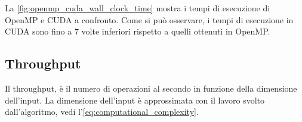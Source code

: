 \documentclass[12pt,a4paper]{report}
\begin{document}
\begin{figure}[H]
\end{figure}

La \autoref{fig:openmp_cuda_wall_clock_time} mostra i tempi di esecuzione di OpenMP e CUDA a confronto.
Come si può osservare, i tempi di esecuzione in CUDA sono fino a 7 volte inferiori rispetto a quelli ottenuti in OpenMP.

\subsection{Throughput}

Il throughput, è il numero di operazioni al secondo in funzione della dimensione dell'input.
La dimensione dell'input è approssimata con il lavoro svolto dall'algoritmo, vedi l'\autoref{eq:computational_complexity}.
\end{document}
